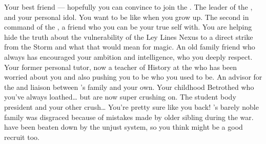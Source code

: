 \documentclass[char]{GL2020}
\begin{document}
\begin{contacts}
    \contact{\cAmbition{}} Your best friend — hopefully you can convince \cAmbition{\them} to join the \pGoaties{}.
    \contact{\cChupLeader{}} The leader of the \pGoaties{}, and your personal idol. You want to be like \cChupLeader{\them} when you grow up.
    \contact{\cChupSecond{}} The second in command of the \pGoaties{}, a friend who you can be your true self with. You are helping \cChupSecond{\them} hide the truth about the vulnerability of the Ley Lines Nexus to a direct strike from the Storm and what that would mean for magic.
    \contact{\cWildCard{}} An old family friend who always has encouraged your ambition and intelligence, who you deeply respect.
    \contact{\cHistory{}} Your former personal tutor, now a teacher of History at the \pSchool{} who has been worried about you and also pushing you to be who you used to be.
    \contact{\cDiplomat{}} An advisor for the \pTech{} and liaison between \cHeir{}'s family and your own.
    \contact{\cHeir{}} Your childhood Betrothed who you've always loathed\ldots{} but are now super crushing on.
    \contact{\cPresident{}} The student body president and your other crush\ldots{} You're pretty sure \cPresident{\they} like you back!
    \contact{\cLibAssist{}} \cLibAssist{}’s barely noble family was disgraced because of mistakes made by \cLibAssist{\their} older sibling during the war. \cLibAssist{\They} have been beaten down by the unjust system, so you think \cLibAssist{\they} might be a good recruit too.
\end{contacts}
\end{document}
